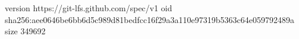 version https://git-lfs.github.com/spec/v1
oid sha256:aee0646be6bb6d5c989d81bedfcc16f29a3a110e97319b5363c64e059792489a
size 349692

